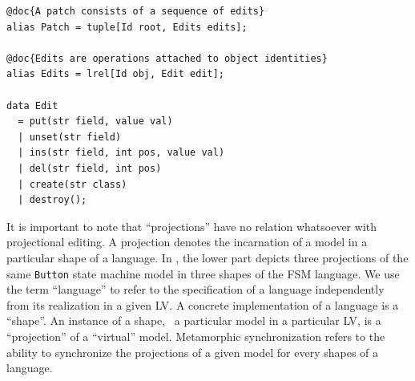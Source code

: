 
\begin{lstlisting}[label=lst:delta-adt, caption={CRUD-like patch definition in Rascal.}, language=Rascal, float=tb]
@doc{A patch consists of a sequence of edits}
alias Patch = tuple[Id root, Edits edits];

@doc{Edits are operations attached to object identities}
alias Edits = lrel[Id obj, Edit edit];

data Edit
  = put(str field, value val)
  | unset(str field)
  | ins(str field, int pos, value val)
  | del(str field, int pos)
  | create(str class) 
  | destroy();
\end{lstlisting}

It is important to note that ``projections'' have no relation whatsoever with projectional editing.
A projection denotes the incarnation of a model in a particular shape of a language.
In , the lower part depicts three projections of the same \texttt{Button} state machine model in three shapes of the FSM language.
We use the term ``language'' to refer to the specification of a language independently from its realization in a given LV.
A concrete implementation of a language is a ``shape''.
An instance of a shape, \ie~a particular model in a particular LV, is a ``projection'' of a ``virtual'' model.
Metamorphic synchronization refers to the ability to synchronize the projections of a given model for every shapes of a language.
